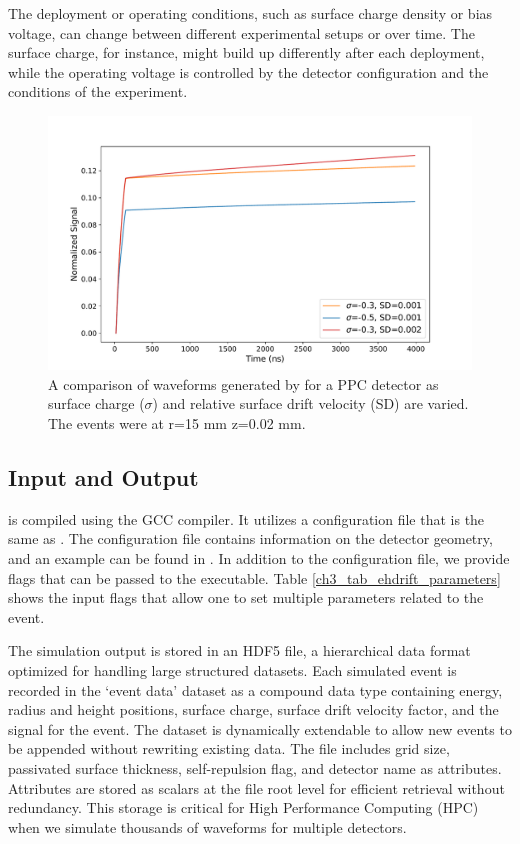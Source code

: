 The deployment or operating conditions, such as surface charge density or bias voltage, can change between different experimental setups or over time. The surface charge, for instance, might build up differently after each deployment, while the operating voltage is controlled by the detector configuration and the conditions of the experiment.

\begin{figure}%
    \includegraphics[trim={0.1cm 0.3cm 1.3cm 0.3cm},clip,width=0.99\linewidth]{ch3/figs/wf_comp.pdf}
    \caption{A comparison of waveforms generated by {\ehd} for a {\Ltwo} PPC detector as surface charge ($\sigma$) and relative surface drift velocity (SD) are varied. The events were at r=15 mm z=0.02 mm.}
    \label{fig:wf_comp}
\end{figure}


\subsection{Input and Output}
{\ehd} is compiled using the GCC compiler. It utilizes a configuration file that is the same as {\siggen}. The configuration file contains information on the detector geometry, and an example can be found in \cite{ehdrift2024}. In addition to the configuration file, we provide flags that can be passed to the executable. Table \ref{ch3_tab_ehdrift_parameters} shows the input flags that allow one to set multiple parameters related to the event.



The simulation output is stored in an HDF5 file, a hierarchical data format optimized for handling large structured datasets. Each simulated event is recorded in the `event data' dataset as a compound data type containing energy, radius and height positions, surface charge, surface drift velocity factor, and the signal for the event. The dataset is dynamically extendable to allow new events to be appended without rewriting existing data. The file includes grid size, passivated surface thickness, self-repulsion flag, and detector name as attributes. Attributes are stored as scalars at the file root level for efficient retrieval without redundancy. This storage is critical for High Performance Computing (HPC) when we simulate thousands of waveforms for multiple detectors.